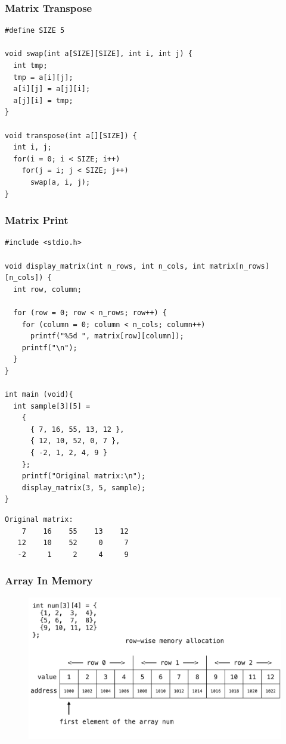 \documentclass{../c-lecture}
\begin{document}
\begin{frame}[fragile]
  \frametitle{Matrix Transpose}
  \scriptsize
  \begin{verbatim}
#define SIZE 5

void swap(int a[SIZE][SIZE], int i, int j) {
  int tmp;
  tmp = a[i][j];
  a[i][j] = a[j][i];
  a[j][i] = tmp;
}

void transpose(int a[][SIZE]) {
  int i, j;
  for(i = 0; i < SIZE; i++)
    for(j = i; j < SIZE; j++)
      swap(a, i, j);
}
  \end{verbatim}
\end{frame}

\begin{frame}[fragile]
  \frametitle{Matrix Print}
  \scriptsize
  \begin{verbatim}
#include <stdio.h>

void display_matrix(int n_rows, int n_cols, int matrix[n_rows][n_cols]) {
  int row, column;

  for (row = 0; row < n_rows; row++) {
    for (column = 0; column < n_cols; column++)
      printf("%5d ", matrix[row][column]);
    printf("\n");
  }
}

int main (void){
  int sample[3][5] =
    {
      { 7, 16, 55, 13, 12 },
      { 12, 10, 52, 0, 7 },
      { -2, 1, 2, 4, 9 }
    };
    printf("Original matrix:\n");
    display_matrix(3, 5, sample);
}
  \end{verbatim}
\end{frame}

\begin{frame}[fragile]
  \begin{verbatim}
Original matrix:
    7    16    55    13    12
   12    10    52     0     7
   -2     1     2     4     9
  \end{verbatim}
\end{frame}

\begin{frame}
  \frametitle{Array In Memory}
  \begin{figure}
    \includegraphics[width=.75\textwidth]{./img/arrays-in-memory.png}
  \end{figure}
\end{frame}
\end{document}
